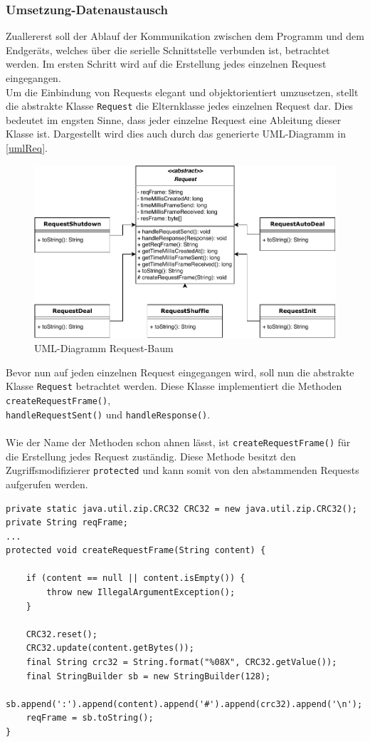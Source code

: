 \subsubsection{Umsetzung-Datenaustausch}
Zuallererst soll der Ablauf der Kommunikation zwischen dem Programm und dem Endgeräts, welches über die serielle Schnittstelle verbunden ist, betrachtet werden.
Im ersten Schritt wird auf die Erstellung jedes einzelnen Request eingegangen.\\
Um die Einbindung von Requests elegant und objektorientiert umzusetzen, stellt die abstrakte Klasse \lstinline[style=java]{Request} die Elternklasse jedes einzelnen Request dar.
Dies bedeutet im engsten Sinne, dass jeder einzelne Request eine Ableitung dieser Klasse ist.
Dargestellt wird dies auch durch das generierte UML-Diagramm in \autoref{umlReq}.
\begin{figure}[H]
\centering
\includegraphics[width=1\textwidth]{fig/ainf/AbstractRequestUML.pdf}
\caption{UML-Diagramm Request-Baum}
\label{umlReq}
\end{figure}
Bevor nun auf jeden einzelnen Request eingegangen wird, soll nun die abstrakte Klasse \lstinline[style=java]{Request} betrachtet werden.
Diese Klasse implementiert die Methoden \lstinline[style=java]{createRequestFrame()},\\ \lstinline[style=java]{handleRequestSent()} und \lstinline[style=java]{handleResponse()}.\\\\
Wie der Name der Methoden schon ahnen lässt, ist \lstinline[style=java]{createRequestFrame()} für die Erstellung jedes Request zuständig.
Diese Methode besitzt den Zugriffsmodifizierer \lstinline[style=java]{protected} und kann somit von den abstammenden Requests aufgerufen werden.
\begin{lstlisting}[style=java,caption=Methode createRequestFrame(),label=Gesamte Methode createRequestFrame()]
private static java.util.zip.CRC32 CRC32 = new java.util.zip.CRC32();
private String reqFrame;
...
protected void createRequestFrame(String content) {

    if (content == null || content.isEmpty()) {
        throw new IllegalArgumentException();
    }

    CRC32.reset();
    CRC32.update(content.getBytes());
    final String crc32 = String.format("%08X", CRC32.getValue());
    final StringBuilder sb = new StringBuilder(128);
    sb.append(':').append(content).append('#').append(crc32).append('\n');
    reqFrame = sb.toString();
}
\end{lstlisting}
